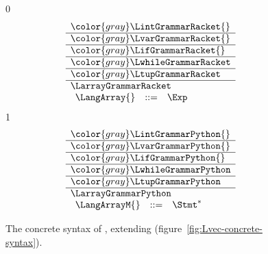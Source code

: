 \documentclass[7x10]{TimesAPriori_MIT}%
\newcommand{\gray}[1]{{\color{gray} #1}}
\def\racketEd{0}
\def\pythonEd{1}
\providecommand{\BookEdition}{1}
\let\edition\BookEdition
\newcommand{\pythonColor}[0]{}
\numberwithin{theorem}{chapter}
\numberwithin{definition}{chapter}
\numberwithin{equation}{chapter}
\begin{document}
\begin{figure}[tp]
\centering
\begin{tcolorbox}[colback=white]
    \small
{\if\edition\racketEd    
\[
\begin{array}{l}
  \gray{\LintGrammarRacket{}} \\ \hline
  \gray{\LvarGrammarRacket{}} \\ \hline
  \gray{\LifGrammarRacket{}} \\ \hline
  \gray{\LwhileGrammarRacket} \\ \hline
  \gray{\LtupGrammarRacket} \\ \hline
  \LarrayGrammarRacket \\
\begin{array}{lcl}
  \LangArray{} &::=& \Exp
\end{array}
\end{array}
\]
\fi}
{\if\edition\pythonEd\pythonColor    
\[
\begin{array}{l}
  \gray{\LintGrammarPython{}} \\ \hline
  \gray{\LvarGrammarPython{}} \\ \hline
  \gray{\LifGrammarPython{}} \\ \hline
  \gray{\LwhileGrammarPython} \\ \hline
  \gray{\LtupGrammarPython} \\ \hline
  \LarrayGrammarPython \\
\begin{array}{rcl}
  \LangArrayM{} &::=& \Stmt^{*}
\end{array}
\end{array}
\]
\fi}
\end{tcolorbox}
\caption{The concrete syntax of \LangArray{}, extending \LangVec{} (figure~\ref{fig:Lvec-concrete-syntax}).}
\label{fig:Lvecof-concrete-syntax}
\end{figure}
\end{document}
